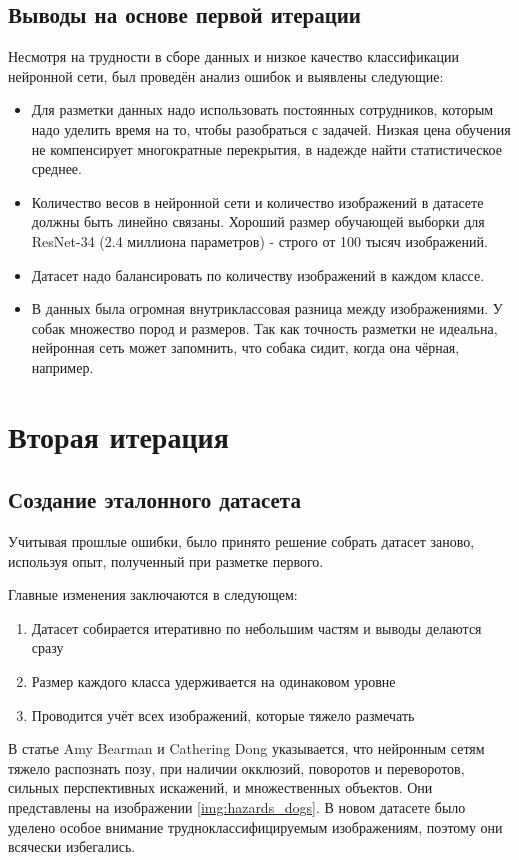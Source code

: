 \subsection{Выводы на основе первой итерации}
Несмотря на трудности в сборе данных и низкое качество классификации нейронной сети, был проведён анализ ошибок и выявлены следующие:
\begin{itemize}
    \item Для разметки данных надо использовать постоянных сотрудников, которым надо уделить время на то, чтобы разобраться с задачей. Низкая цена обучения не компенсирует многократные перекрытия, в надежде найти статистическое среднее.
    \item Количество весов в нейронной сети и количество изображений в датасете должны быть линейно связаны. Хороший размер обучающей выборки для ResNet-34 (2.4 миллиона параметров) - строго от 100 тысяч изображений.
    \item Датасет надо балансировать по количеству изображений в каждом классе.
    \item В данных была огромная внутриклассовая разница между изображениями. У собак множество пород и размеров. Так как точность разметки не идеальна, нейронная сеть может запомнить, что собака сидит, когда она чёрная, например. 
\end{itemize}{}

\section{Вторая итерация} \label {second_iter}

\subsection{Создание эталонного датасета} \label{subsect3_1_2}
Учитывая прошлые ошибки, было принято решение собрать датасет заново, используя опыт, полученный при разметке первого.

Главные изменения заключаются в следующем:
\begin{enumerate}
    \item Датасет собирается итеративно по небольшим частям и выводы делаются сразу
    \item Размер каждого класса удерживается на одинаковом уровне
    \item Проводится учёт всех изображений, которые тяжело размечать
\end{enumerate}{}

В статье Amy Bearman и Cathering Dong \cite{Bearman2015HumanPE} указывается, что нейронным сетям тяжело распознать позу, при наличии окклюзий, поворотов и переворотов, сильных перспективных искажений, и множественных объектов. Они представлены на изображении \ref{img:hazards_dogs}. В новом датасете было уделено особое внимание трудноклассифицируемым изображениям, поэтому они всячески избегались.

